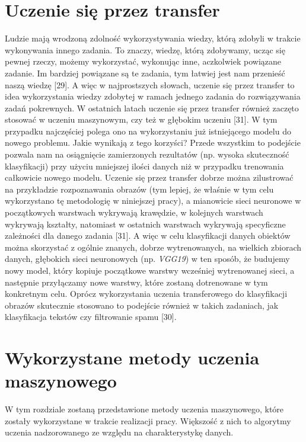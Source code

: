 \section{Uczenie się przez transfer}
\label{cha:cha3.5}

Ludzie mają wrodzoną zdolność wykorzystywania wiedzy, którą zdobyli w trakcie wykonywania innego zadania. To znaczy, wiedzę, którą zdobywamy, ucząc się pewnej rzeczy, możemy wykorzystać, wykonując inne, aczkolwiek powiązane zadanie. Im bardziej powiązane są te zadania, tym łatwiej jest nam przenieść naszą wiedzę [29]. A więc w najprostszych słowach, uczenie się przez transfer to idea wykorzystania wiedzy zdobytej w ramach jednego zadania do rozwiązywania zadań pokrewnych. W ostatnich latach uczenie się przez transfer również zaczęto stosować w uczeniu maszynowym, czy też w głębokim uczeniu [31]. W tym przypadku najczęściej polega ono na wykorzystaniu już istniejącego modelu do nowego problemu. Jakie wynikają z tego korzyści? Przede wszystkim to podejście pozwala nam na osiągnięcie zamierzonych rezultatów (np. wysoka skuteczność klasyfikacji) przy użyciu mniejszej ilości danych niż w przypadku trenowania całkowicie nowego modelu. 
Uczenie się przez transfer dobrze można zilustrować na przykładzie rozpoznawania obrazów (tym lepiej, że właśnie w tym celu wykorzystano tę metodologię w niniejszej pracy), a mianowicie sieci neuronowe w początkowych warstwach wykrywają krawędzie, w kolejnych warstwach wykrywają kształty, natomiast w ostatnich warstwach wykrywają specyficzne zależności dla danego zadania [31]. A więc w celu klasyfikacji danych obiektów można skorzystać z ogólnie znanych, dobrze wytrenowanych, na wielkich zbiorach danych, głębokich sieci neuronowych (np. \textit{VGG19}) w ten sposób, że budujemy nowy model, który kopiuje początkowe warstwy wcześniej wytrenowanej sieci, a następnie przyłączamy nowe warstwy, które zostaną dotrenowane w tym konkretnym celu. Oprócz wykorzystania uczenia transferowego do klasyfikacji obrazów skutecznie stosowano to podejście również w takich zadaniach, jak klasyfikacja tekstów czy filtrowanie spamu [30]. 


\section{Wykorzystane metody uczenia maszynowego}
\label{cha:Wykorzystane metody uczenia maszynowego}

W tym rozdziale zostaną przedstawione metody uczenia maszynowego, które zostały wykorzystane w trakcie realizacji pracy. Większość z nich to algorytmy uczenia nadzorowanego ze względu na charakterystykę danych.

